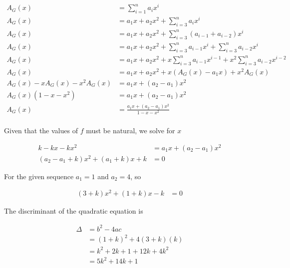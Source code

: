\documentclass[12pt]{scrartcl}
\begin{document}
\begin{align*}
    A_G(x)                   & =\sum_{i=1}^{n}a_ix^i                                                      \\
    A_G(x)                   & =a_1x+a_2x^2+\sum_{i=3}^{n}a_ix^i                                          \\
    A_G(x)                   & =a_1x+a_2x^2+\sum_{i=3}^{n}(a_{i-1}+a_{i-2})x^i                            \\
    A_G(x)                   & =a_1x+a_2x^2+\sum_{i=3}^{n}a_{i-1}x^i+\sum_{i=3}^{n}a_{i-2}x^i             \\
    A_G(x)                   & =a_1x+a_2x^2+x\sum_{i=3}^{n}a_{i-1}x^{i-1}+x^2\sum_{i=3}^{n}a_{i-2}x^{i-2} \\
    A_G(x)                   & =a_1x+a_2x^2+x \left( A_G(x)-a_1x \right) +x^2A_G(x)                       \\
    A_G(x)-xA_G(x)-x^2A_G(x) & =a_1x+(a_2-a_1)x^2                                                         \\
    A_G(x)(1-x-x^2)          & =a_1x+(a_2-a_1)x^2                                                         \\
    A_G(x)                   & =\frac{a_1x+(a_2-a_1)x^2 }{1-x-x^2}                                        \\
\end{align*}

Given that the values of $f$ must be natural, we solve for $x$

\begin{align*}
    k-kx-kx^2                 & =a_1x+(a_2-a_1)x^2 \\
    (a_2-a_1+k)x^2+(a_1+k)x+k & =0
\end{align*}

For the given sequence $a_1=1$ and $a_2=4$, so

\begin{align*}
    (3+k)x^2+(1+k)x-k & =0
\end{align*}

The discriminant of the quadratic equation is

\begin{align*}
    \Delta & =b^2-4ac           \\
           & =(1+k)^2+4(3+k)(k) \\
           & =k^2+2k+1+12k+4k^2 \\
           & =5k^2+14k+1
\end{align*}
\end{document}
